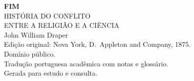 \documentclass[11pt,a5paper,twoside,openany]{book}
\begin{document}
\clearpage

\thispagestyle{empty}
\vspace*{4cm}
\begin{center}
{\Large\bfseries FIM}\\[2cm]
{\large HISTÓRIA DO CONFLITO}\\
{\large ENTRE A RELIGIÃO E A CIÊNCIA}\\[1cm]
{\normalsize John William Draper}\\[2cm]
{\small Edição original: Nova York, D.\ Appleton and Company, 1875.}\\[8pt]
{\small Domínio público.}\\[1.5cm]
{\small Tradução portuguesa acadêmica com notas e glossário.}\\[8pt]
{\small Gerada para estudo e consulta.}
\end{center}
\end{document}
